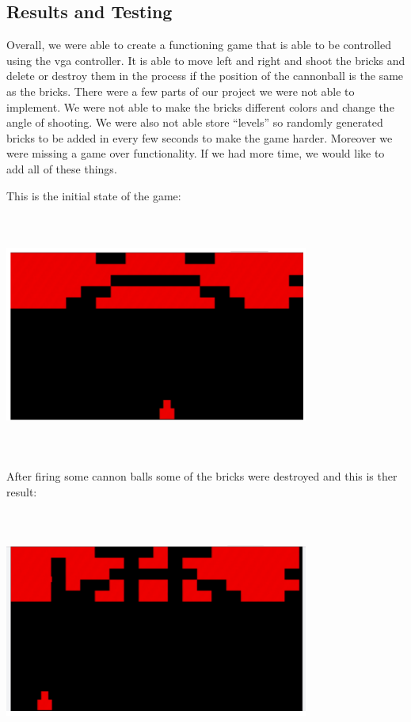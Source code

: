 \documentclass[12pt]{article}
\begin{document}
\begin{flushleft}
\section{Results and Testing}

Overall, we were able to create a functioning game that is able to be controlled
using the vga controller. It is able to move left and right and shoot the bricks
and delete or destroy them in the process if the position of the cannonball is
the same as the bricks. There were a few parts of our project we were not able
to implement. We were not able to make the bricks different colors and change
the angle of shooting. We were also not able store “levels” so randomly
generated bricks to be added in every few seconds to make the game harder.
Moreover we were missing a game over functionality. If we had more time, we
would like to add all of these things. 

This is the initial state of the game: \\
\begin{center}
\includegraphics[width=10cm, height=8cm]{game1}
\end{center}

After firing some cannon balls some of the bricks were destroyed and this is
ther result:\\
\begin{center}
\includegraphics[width=10cm, height=8cm]{game2}
\end{center}


\end{flushleft}
\end{document}
